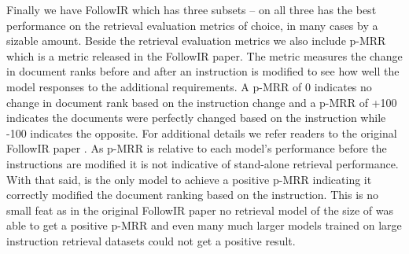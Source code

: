 \documentclass[sigconf,]{acmart}
\begin{document}
Finally we have FollowIR which has three subsets -- on all three \name{} has the best performance on the retrieval evaluation metrics of choice, in many cases by a sizable amount. Beside the retrieval evaluation metrics we also include p-MRR which is a metric released in the FollowIR \cite{FollowIR} paper. The metric measures the change in document ranks before and after an instruction is modified to see how well the model responses to the additional requirements. A p-MRR of 0 indicates no change in document rank based on the instruction change and a p-MRR of +100 indicates the documents were perfectly changed based on the instruction while -100 indicates the opposite. For additional details we refer readers to the original FollowIR paper \cite{FollowIR}. As p-MRR is relative to each model's performance before the instructions are modified it is not indicative of stand-alone retrieval performance. With that said, \name{} is the only model to achieve a positive p-MRR indicating it correctly modified the document ranking based on the instruction. This is no small feat as in the original FollowIR paper no retrieval model of the size of \name{} was able to get a positive p-MRR and even many much larger models trained on large instruction retrieval datasets could not get a positive result.
\end{document}
